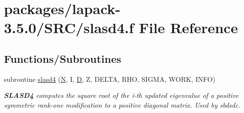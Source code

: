 \hypertarget{slasd4_8f}{}\section{packages/lapack-\/3.5.0/\+S\+R\+C/slasd4.f File Reference}
\label{slasd4_8f}
\subsection*{Functions/\+Subroutines}
\begin{DoxyCompactItemize}
\item 
subroutine \hyperlink{group__auxOTHERauxiliary_ga6680aa4ad62702cd9a00d7530c8ab53a}{slasd4} (\hyperlink{polmisc_8c_a0240ac851181b84ac374872dc5434ee4}{N}, I, \hyperlink{odrpack_8h_a7dae6ea403d00f3687f24a874e67d139}{D}, Z, D\+E\+L\+T\+A, R\+H\+O, S\+I\+G\+M\+A, W\+O\+R\+K, I\+N\+F\+O)
\begin{DoxyCompactList}\small\item\em {\bfseries S\+L\+A\+S\+D4} computes the square root of the i-\/th updated eigenvalue of a positive symmetric rank-\/one modification to a positive diagonal matrix. Used by sbdsdc. \end{DoxyCompactList}\end{DoxyCompactItemize}
